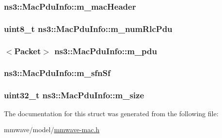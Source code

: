 \subsubsection[{\texorpdfstring{m\+\_\+mac\+Header}{m_macHeader}}]{ ns3\+::\+Mac\+Pdu\+Info\+::m\+\_\+mac\+Header}\hypertarget{structns3_1_1MacPduInfo_ae337e900ffaeee57e5ab6d5d89cb2842}{}\label{structns3_1_1MacPduInfo_ae337e900ffaeee57e5ab6d5d89cb2842}
\subsubsection[{\texorpdfstring{m\+\_\+num\+Rlc\+Pdu}{m_numRlcPdu}}]{\setlength{\rightskip}{0pt plus 5cm}uint8\+\_\+t ns3\+::\+Mac\+Pdu\+Info\+::m\+\_\+num\+Rlc\+Pdu}\hypertarget{structns3_1_1MacPduInfo_a03b7567bfc0fee0e8b90c799a9ac142f}{}\label{structns3_1_1MacPduInfo_a03b7567bfc0fee0e8b90c799a9ac142f}
\subsubsection[{\texorpdfstring{m\+\_\+pdu}{m_pdu}}]{$<${\bf Packet}$>$ ns3\+::\+Mac\+Pdu\+Info\+::m\+\_\+pdu}\hypertarget{structns3_1_1MacPduInfo_a6f25302a0457bf937e74bad820b90304}{}\label{structns3_1_1MacPduInfo_a6f25302a0457bf937e74bad820b90304}
\subsubsection[{\texorpdfstring{m\+\_\+sfn\+Sf}{m_sfnSf}}]{ ns3\+::\+Mac\+Pdu\+Info\+::m\+\_\+sfn\+Sf}\hypertarget{structns3_1_1MacPduInfo_ab4a384a3ad7656d97a44dac15f999dc3}{}\label{structns3_1_1MacPduInfo_ab4a384a3ad7656d97a44dac15f999dc3}
\subsubsection[{\texorpdfstring{m\+\_\+size}{m_size}}]{\setlength{\rightskip}{0pt plus 5cm}uint32\+\_\+t ns3\+::\+Mac\+Pdu\+Info\+::m\+\_\+size}\hypertarget{structns3_1_1MacPduInfo_a5edfc030dcb999c430d7bde249b78003}{}\label{structns3_1_1MacPduInfo_a5edfc030dcb999c430d7bde249b78003}


The documentation for this struct was generated from the following file\+:\begin{DoxyCompactItemize}
\item 
mmwave/model/\hyperlink{mmwave-mac_8h}{mmwave-\/mac.\+h}\end{DoxyCompactItemize}
